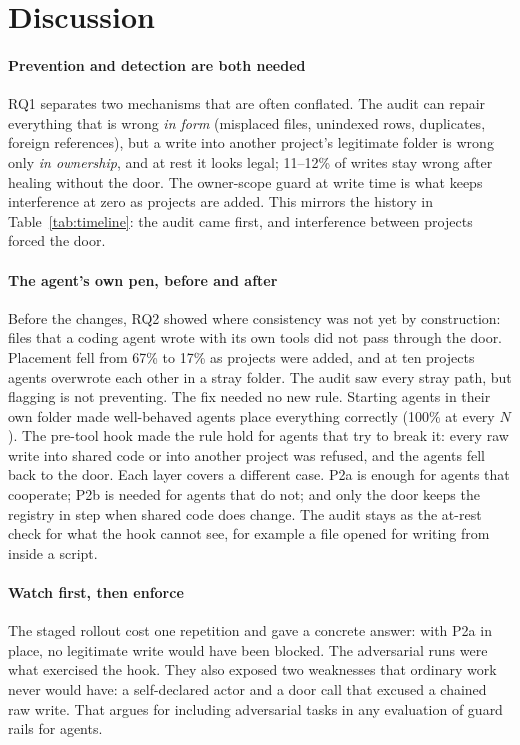 \section{Discussion}\label{sec:discussion}
\paragraph*{Prevention and detection are both needed} RQ1 separates two mechanisms that are often conflated. The audit can repair everything that is wrong \emph{in form} (misplaced files, unindexed rows, duplicates, foreign references), but a write into another project's legitimate folder is wrong only \emph{in ownership}, and at rest it looks legal; 11--12\% of writes stay wrong after healing without the door. The owner-scope guard at write time is what keeps interference at zero as projects are added. This mirrors the history in Table~\ref{tab:timeline}: the audit came first, and interference between projects forced the door.

\paragraph*{The agent's own pen, before and after} Before the changes, RQ2 showed where consistency was not yet by construction: files that a coding agent wrote with its own tools did not pass through the door. Placement fell from 67\% to 17\% as projects were added, and at ten projects agents overwrote each other in a stray folder. The audit saw every stray path, but flagging is not preventing. The fix needed no new rule. Starting agents in their own folder made well-behaved agents place everything correctly (100\% at every $N$). The pre-tool hook made the rule hold for agents that try to break it: every raw write into shared code or into another project was refused, and the agents fell back to the door. Each layer covers a different case. P2a is enough for agents that cooperate; P2b is needed for agents that do not; and only the door keeps the registry in step when shared code does change. The audit stays as the at-rest check for what the hook cannot see, for example a file opened for writing from inside a script.

\paragraph*{Watch first, then enforce} The staged rollout cost one repetition and gave a concrete answer: with P2a in place, no legitimate write would have been blocked. The adversarial runs were what exercised the hook. They also exposed two weaknesses that ordinary work never would have: a self-declared actor and a door call that excused a chained raw write. That argues for including adversarial tasks in any evaluation of guard rails for agents.

